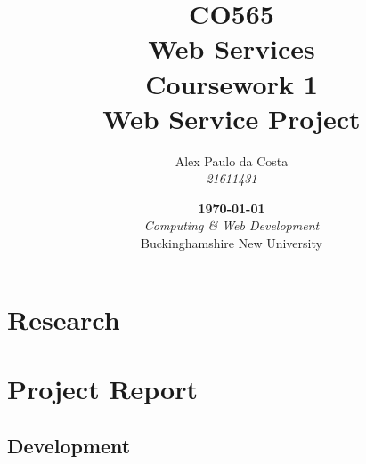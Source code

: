 \documentclass[hidelinks]{report}
\title{
        \fontspec[Path=.fonts/]{LibertineDisplay.ttf}
        \Large CO565\\
        Web Services\\
        Coursework 1\vspace*{.65cm}\\
        \huge Web Service Project\vfill
    }
\author{
        Alex Paulo da Costa\\
        \textit{21611431}\\
    }
\date{
        \vfill\textbf{\today}\\
        \vspace*{.75cm}\textit{Computing \& Web Development}\\
        Buckinghamshire New University
    }
\begin{document}
    
        \maketitle
        \tableofcontents

        \part{Research}
        
        
        
        
        \part{Project Report}
        
        
        
        \chapter{Development}
        
        
        
        
    
\end{document}
